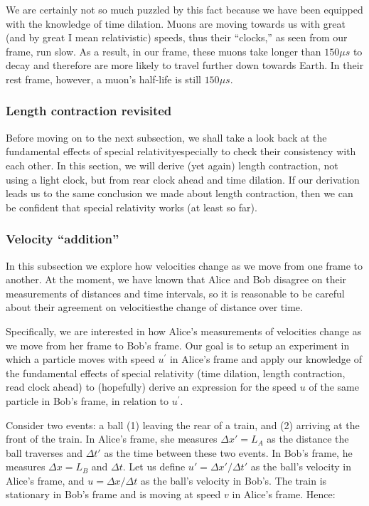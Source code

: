 \documentclass[a4paper,11pt]{article}
\numberwithin{equation}{section}
\begin{document}
 \noindent We are certainly not so much puzzled by this fact because we have been equipped with the knowledge of time dilation. Muons are moving towards us with great (and by great I mean relativistic) speeds, thus their ``clocks,'' as seen from our frame, run slow. As a result, in our frame, these muons take longer than $150\mu s$ to decay and therefore are more likely to travel further down towards Earth. In their rest frame, however, a muon's half-life is still $150\mu s$. 
 
 \subsubsection{Length contraction revisited}
 Before moving on to the next subsection, we shall take a look back at the fundamental effects of special relativity\textemdash especially to check their consistency with each other. In this section, we will derive (yet again) length contraction, not using a light clock, but from rear clock ahead and time dilation. If our derivation leads us to the same conclusion we made about length contraction, then we can be confident that special relativity works (at least so far).
 
 \subsubsection{Velocity ``addition''}
 In this subsection we explore how velocities change as we move from one frame to another. At the moment, we have known that Alice and Bob disagree on their measurements of distances and time intervals, so it is reasonable to be careful about their agreement on velocities\textemdash the change of distance over time.
 
 \noindent Specifically, we are interested in how Alice's measurements of velocities change as we move from her frame to Bob's frame. Our goal is to setup an experiment in which a particle moves with speed $u^{\prime}$ in Alice's frame and apply our knowledge of the fundamental effects of special relativity (time dilation, length contraction, read clock ahead) to (hopefully) derive an expression for the speed $u$ of the same particle in Bob's frame, in relation to $u^{\prime}$. 
 
 \noindent Consider two events: a ball (1) leaving the rear of a train, and (2) arriving at the front of the train. In Alice's frame, she measures $\Delta x' = L_A$ as the distance the ball traverses and $\Delta t'$ as the time between these two events. In Bob's frame, he measures $\Delta x = L_B$ and $\Delta t$. Let us define $u' = \Delta x' / \Delta t'$ as the ball's velocity in Alice's frame, and $u = \Delta x / \Delta t$ as the ball's velocity in Bob's. The train is stationary in Bob's frame and is moving at speed $v$ in Alice's frame. Hence:
 
\end{document}
